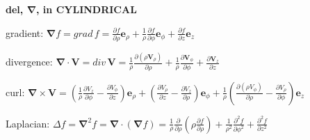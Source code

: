 \documentclass[letterpaper,landscape,10pt]{article}
\newenvironment{mydescription}
{\begin{description}
	\setlength{\itemsep}{0pt}
	\setlength{\parskip}{0pt}
	\setlength{\parsep}{-1pt}}
{\end{description}}
\begin{document}
{\begin{multicols}{3}
		\vspace{-8pt}

		\begin{center}\textbf{del, $\mathbf{\nabla}$, in CYLINDRICAL}\end{center}
		\begin{mydescription}
			\item[gradient:]
				$\mathbf{\nabla}f =
				grad\,f =
				\frac{\partial f}{\partial\rho}\mathbf{e}_\rho +
				\frac{1}{\rho}\frac{\partial f}{\partial\phi}\mathbf{e}_\phi +
				\frac{\partial f}{\partial z}\mathbf{e}_z$
			\item[divergence:]
				$\mathbf{\nabla}\cdot\mathbf{V} =
				div\, \mathbf{V} =
				\frac{1}{\rho}\frac{\partial(\rho\mathbf{V}_\rho)}{\partial\rho} +
				\frac{1}{\rho}\frac{\partial \mathbf{V}_\phi}{\partial\phi} +
				\frac{\partial \mathbf{V}_z}{\partial z}
				$
			\item[curl:]
				$\mathbf{\nabla}\times \mathbf{V} =
				\left({ \frac{1}{\rho}\frac{\partial V_z}{\partial\phi} -
					\frac{\partial V_\phi}{\partial z}}\right)\mathbf{e}_\rho+
				\left({ \frac{\partial V_\rho}{\partial z} -
					\frac{\partial  V_z}{\partial\rho}}\right)\mathbf{e}_\phi+
				\frac{1}{\rho}\left({
					\frac{\partial(\rho V_\phi)}{\partial\rho} -
					\frac{\partial V_\rho}{\partial\phi}}\right)\mathbf{e}_z
				$
			\item[Laplacian:]
				$\Delta f = \mathbf{\nabla}^2f =
				\mathbf{\nabla} \cdot (\mathbf{\nabla}f) =
				\frac{1}{\rho}\frac{\partial}{\partial\rho}\left({
				\rho\frac{\partial f}{\partial\rho}}\right) +
				\frac{1}{\rho^2}\frac{\partial^2 f}{\partial\phi^2} +
				\frac{\partial^2 f}{\partial z^2}
				$
		\end{mydescription}
		
		\vspace{-8pt}


\end{multicols}}
\end{document}
